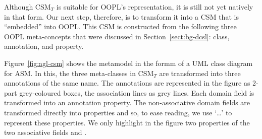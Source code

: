 Although CSM$_T$ is suitable for OOPL's representation, it is still not yet natively in that form. Our next step, therefore, is to transform it into a CSM that is ``embedded'' into OOPL. This CSM is constructed from the following three OOPL meta-concepts that were discussed in Section~\ref{sect:bg-dcsl}: class, annotation, and property.

Figure~\ref{fig:agl-csm} shows the metamodel in the formm of a UML class diagram for ASM. In this, the three meta-classes in CSM$_T$ are transformed into three annotations of the same name. The annotations are represented in the figure as 2-part grey-coloured boxes, the association lines as grey lines. Each domain field is transformed into an annotation property. The non-associative domain fields are transformed directly into properties and so, to ease reading, we use `\dots' to represent these properties. We only highlight in the figure two properties of the two associative fields  and . 

